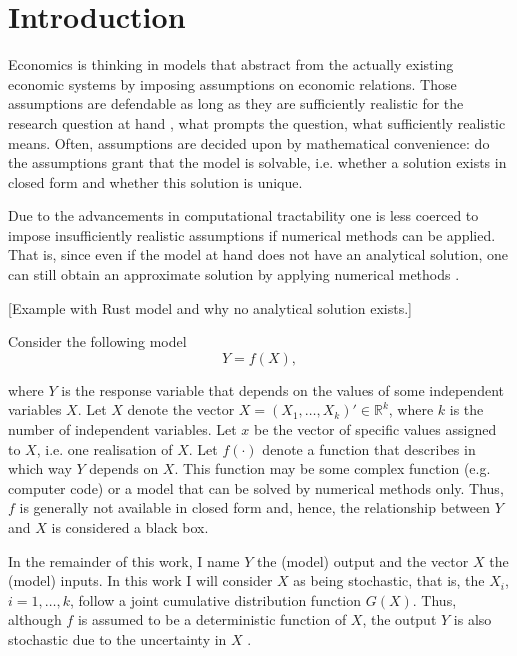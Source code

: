 \section{Introduction} \label{intro}

Economics is thinking in models that abstract from the actually existing economic systems by imposing assumptions on economic relations. Those assumptions are defendable as long as they are sufficiently realistic for the research question at hand \citep{F66}, what prompts the question, what sufficiently realistic means. Often, assumptions are decided upon by mathematical convenience: do the assumptions grant that the model is solvable, i.e. whether a solution exists in closed form and whether this solution is unique.

Due to the advancements in computational tractability one is less coerced to impose insufficiently realistic assumptions if numerical methods can be applied. That is, since even if the model at hand does not have an analytical solution, one can still obtain an approximate solution by applying numerical methods \citep{MF04}.

[Example with Rust model and why no analytical solution exists.]

\noindent Consider the following model
\begin{equation*}
Y = f(X),
\end{equation*}

where $Y$ is the response variable that depends on the values of some independent variables $X$. Let $X$ denote the vector $X = (X_1, \dots, X_k)' \in \mathbb{R}^k$, where $k$ is the number of independent variables. Let $x$ be the vector of specific values assigned to $X$, i.e. one realisation of $X$. Let $f(\cdot)$ denote a function that describes in which way $Y$ depends on $X$. This function may be some complex function (e.g. computer code) or a model that can be solved by numerical methods only. Thus, $f$ is generally not available in closed form and, hence, the relationship between $Y$ and $X$ is considered a black box.

In the remainder of this work, I name $Y$ the (model) output and the vector $X$ the (model) inputs. In this work I will consider $X$ as being stochastic, that is, the $X_i$, $i = 1,\dots, k$, follow a joint cumulative distribution function $G(X)$. Thus, although $f$ is assumed to be a deterministic function of $X$, the output $Y$ is also stochastic due to the uncertainty in $X$ \citep{SNS16}.

